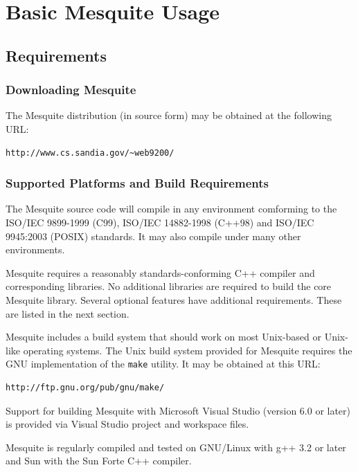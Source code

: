 \documentclass[letter]{report}
\begin{document}
\chapter{Basic Mesquite Usage} \label{sec:basics}

\section{Requirements}

\subsection{Downloading Mesquite}
The Mesquite distribution (in source form) may be obtained at the following URL:
\begin{verbatim}
http://www.cs.sandia.gov/~web9200/
\end{verbatim}

\subsection{Supported Platforms and Build Requirements}
The Mesquite source code will compile in any environment comforming to the ISO/IEC 9899-1999 (C99), ISO/IEC 14882-1998 (C++98) and ISO/IEC 9945:2003 (POSIX) standards.
It may also compile under many other environments.

Mesquite requires a reasonably standards-conforming C++ compiler and corresponding libraries.  No additional libraries are required to build the core Mesquite library.
Several optional features have additional requirements.  These are listed in the next section.

Mesquite includes a build system that should work on most Unix-based or Unix-like
operating systems.  The Unix build system provided for Mesquite requires the GNU implementation of the \texttt{make} utility.  It may be obtained at this URL:
\begin{verbatim}
http://ftp.gnu.org/pub/gnu/make/
\end{verbatim}

Support for building Mesquite with Microsoft Visual Studio (version 6.0 or later) is provided via Visual Studio project and workspace files.

Mesquite is regularly compiled and tested on GNU/Linux with g++ 3.2 or later and Sun with the Sun Forte C++ compiler.  
\end{document}
